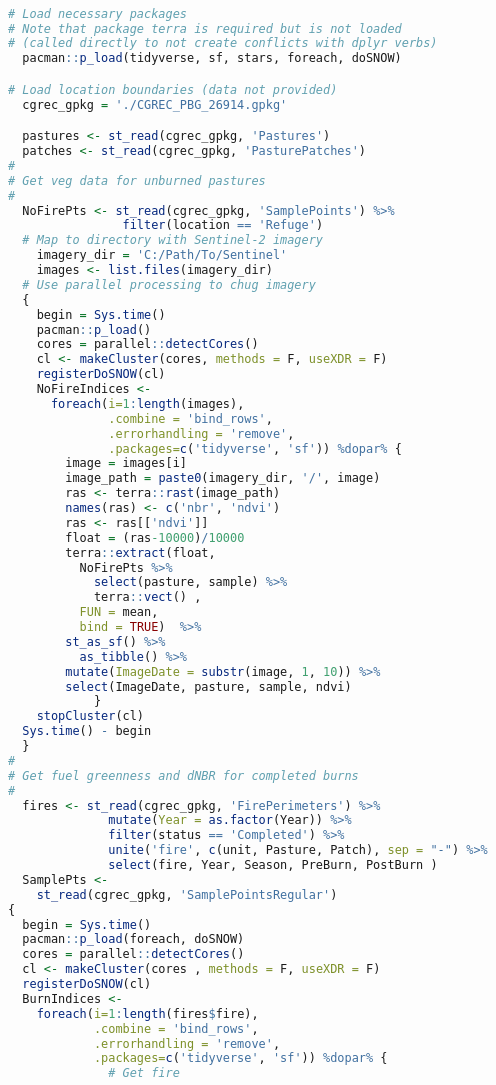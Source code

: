 \documentclass[
]{article}
\begin{document}
\begin{lstlisting}[language=R] 

# Load necessary packages
# Note that package terra is required but is not loaded
# (called directly to not create conflicts with dplyr verbs)
  pacman::p_load(tidyverse, sf, stars, foreach, doSNOW)

# Load location boundaries (data not provided)
  cgrec_gpkg = './CGREC_PBG_26914.gpkg'

  pastures <- st_read(cgrec_gpkg, 'Pastures') 
  patches <- st_read(cgrec_gpkg, 'PasturePatches') 
#
# Get veg data for unburned pastures
#
  NoFirePts <- st_read(cgrec_gpkg, 'SamplePoints') %>%
                filter(location == 'Refuge')
  # Map to directory with Sentinel-2 imagery
    imagery_dir = 'C:/Path/To/Sentinel'
    images <- list.files(imagery_dir)
  # Use parallel processing to chug imagery
  { 
    begin = Sys.time() 
    pacman::p_load()
    cores = parallel::detectCores()
    cl <- makeCluster(cores, methods = F, useXDR = F)
    registerDoSNOW(cl)
    NoFireIndices <-
      foreach(i=1:length(images), 
              .combine = 'bind_rows',
              .errorhandling = 'remove', 
              .packages=c('tidyverse', 'sf')) %dopar% {
        image = images[i]
        image_path = paste0(imagery_dir, '/', image)
        ras <- terra::rast(image_path)
        names(ras) <- c('nbr', 'ndvi') 
        ras <- ras[['ndvi']]
        float = (ras-10000)/10000
        terra::extract(float,
          NoFirePts %>%
            select(pasture, sample) %>%
            terra::vect() , 
          FUN = mean, 
          bind = TRUE)  %>%
        st_as_sf() %>%
          as_tibble() %>%
        mutate(ImageDate = substr(image, 1, 10)) %>%
        select(ImageDate, pasture, sample, ndvi) 
            }
    stopCluster(cl)
  Sys.time() - begin 
  }
#
# Get fuel greenness and dNBR for completed burns
#
  fires <- st_read(cgrec_gpkg, 'FirePerimeters') %>%
              mutate(Year = as.factor(Year)) %>%
              filter(status == 'Completed') %>%
              unite('fire', c(unit, Pasture, Patch), sep = "-") %>%
              select(fire, Year, Season, PreBurn, PostBurn )
  SamplePts <- 
    st_read(cgrec_gpkg, 'SamplePointsRegular')
{ 
  begin = Sys.time() 
  pacman::p_load(foreach, doSNOW)
  cores = parallel::detectCores()
  cl <- makeCluster(cores , methods = F, useXDR = F)
  registerDoSNOW(cl)
  BurnIndices <-
    foreach(i=1:length(fires$fire), 
            .combine = 'bind_rows',
            .errorhandling = 'remove', 
            .packages=c('tidyverse', 'sf')) %dopar% {
              # Get fire

\end{lstlisting}
\end{document}
